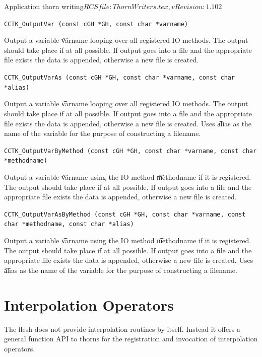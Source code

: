 \begin{cactuspart}{2}{Application thorn writing}{$RCSfile: ThornWriters.tex,v $}{$Revision: 1.102 $}
\begin{Lentry}
\item[{\tt CCTK\_OutputVar (const cGH *GH, const char *varname)}]

Output a variable {\t varname} looping over all registered IO methods.
The output should take place if at all possible.  If output goes into
a file and the appropriate file exists the data is appended, otherwise
a new file is created.

\item[{\tt CCTK\_OutputVarAs (const cGH *GH, const char *varname, const char *alias)}]

Output a variable {\t varname} looping over all registered IO methods.
The output should take place if at all possible.  If output goes into
a file and the appropriate file exists the data is appended, otherwise
a new file is created.  Uses {\t alias} as the name of the variable
for the purpose of constructing a filename.

\item[{\tt CCTK\_OutputVarByMethod (const cGH *GH, const char *varname, const char *methodname)}]

Output a variable {\t varname} using the IO method {\t methodname} if
it is registered. The output should take place if at all possible.  If
output goes into a file and the appropriate file exists the data is
appended, otherwise a new file is created.

\item[{\tt CCTK\_OutputVarAsByMethod (const cGH *GH,
                                     const char *varname,
                                     const char *methodname,
                                     const char *alias)}]

Output a variable {\t varname} using the IO method {\t methodname} if
it is registered.  The output should take place if at all possible.
If output goes into a file and the appropriate file exists the data is
appended, otherwise a new file is created.  Uses {\t alias} as the
name of the variable for the purpose of constructing a filename.

\end{Lentry}


\section{Interpolation Operators}
\label{sec:inop}

The flesh does not provide interpolation routines by itself. Instead
it offers a general function API to thorns for the registration and
invocation of interpolation operators.


\end{cactuspart}
